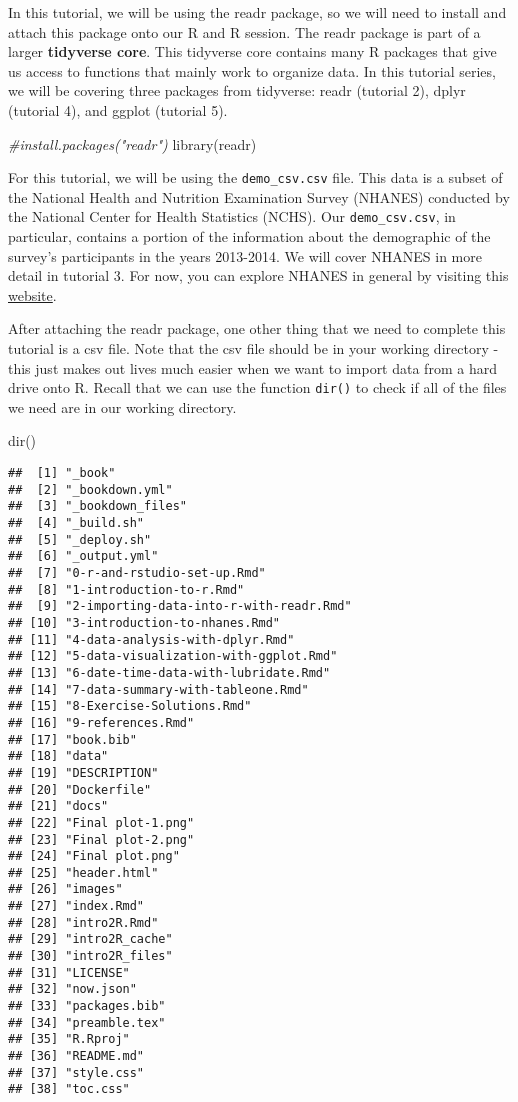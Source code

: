 \documentclass[
]{book}
\newenvironment{Shaded}{\begin{snugshade}}{\end{snugshade}}
\newcommand{\CommentTok}[1]{\textcolor[rgb]{0.56,0.35,0.01}{\textit{#1}}}
\newcommand{\FunctionTok}[1]{\textcolor[rgb]{0.00,0.00,0.00}{#1}}
\newcommand{\NormalTok}[1]{#1}
\begin{document}
In this tutorial, we will be using the readr package, so we will need to install and attach this package onto our R and R session. The readr package is part of a larger \textbf{tidyverse core}. This tidyverse core contains many R packages that give us access to functions that mainly work to organize data. In this tutorial series, we will be covering three packages from tidyverse: readr (tutorial 2), dplyr (tutorial 4), and ggplot (tutorial 5).

\begin{Shaded}
\begin{Highlighting}[]
\CommentTok{\#install.packages("readr")}
\FunctionTok{library}\NormalTok{(readr)}
\end{Highlighting}
\end{Shaded}

For this tutorial, we will be using the \texttt{demo\_csv.csv} file. This data is a subset of the National Health and Nutrition Examination Survey (NHANES) conducted by the National Center for Health Statistics (NCHS). Our \texttt{demo\_csv.csv}, in particular, contains a portion of the information about the demographic of the survey's participants in the years 2013-2014. We will cover NHANES in more detail in tutorial 3. For now, you can explore NHANES in general by visiting this \href{https://wwwn.cdc.gov/nchs/nhanes/Default.aspx}{website}.

After attaching the readr package, one other thing that we need to complete this tutorial is a csv file. Note that the csv file should be in your working directory - this just makes out lives much easier when we want to import data from a hard drive onto R. Recall that we can use the function \texttt{dir()} to check if all of the files we need are in our working directory.

\begin{Shaded}
\begin{Highlighting}[]
\FunctionTok{dir}\NormalTok{()}
\end{Highlighting}
\end{Shaded}

\begin{verbatim}
##  [1] "_book"
##  [2] "_bookdown.yml"
##  [3] "_bookdown_files"
##  [4] "_build.sh"
##  [5] "_deploy.sh"
##  [6] "_output.yml"
##  [7] "0-r-and-rstudio-set-up.Rmd"
##  [8] "1-introduction-to-r.Rmd"
##  [9] "2-importing-data-into-r-with-readr.Rmd"
## [10] "3-introduction-to-nhanes.Rmd"
## [11] "4-data-analysis-with-dplyr.Rmd"
## [12] "5-data-visualization-with-ggplot.Rmd"
## [13] "6-date-time-data-with-lubridate.Rmd"
## [14] "7-data-summary-with-tableone.Rmd"
## [15] "8-Exercise-Solutions.Rmd"
## [16] "9-references.Rmd"
## [17] "book.bib"
## [18] "data"
## [19] "DESCRIPTION"
## [20] "Dockerfile"
## [21] "docs"
## [22] "Final plot-1.png"
## [23] "Final plot-2.png"
## [24] "Final plot.png"
## [25] "header.html"
## [26] "images"
## [27] "index.Rmd"
## [28] "intro2R.Rmd"
## [29] "intro2R_cache"
## [30] "intro2R_files"
## [31] "LICENSE"
## [32] "now.json"
## [33] "packages.bib"
## [34] "preamble.tex"
## [35] "R.Rproj"
## [36] "README.md"
## [37] "style.css"
## [38] "toc.css"
\end{verbatim}
\end{document}
